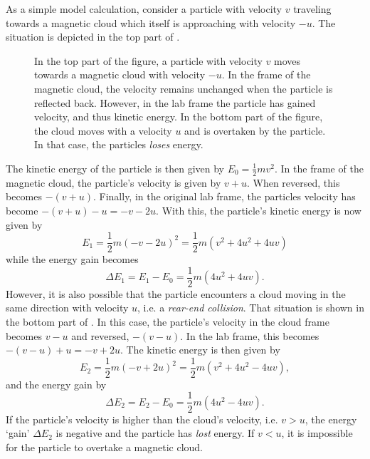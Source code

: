 As a simple model calculation, consider a particle with velocity $v$
traveling towards a magnetic cloud which itself is approaching with velocity
$-u$.  The situation is depicted in the top part of
.
\begin{figure}
\centering

\caption{  In the top part of the
figure, a particle with velocity $v$ moves towards a magnetic cloud with
velocity $-u$.  In the frame of the magnetic cloud, the velocity remains
unchanged when the particle is reflected back.  However, in the lab frame
the particle has gained velocity, and thus kinetic energy.  In the bottom
part of the figure, the cloud moves with a velocity $u$ and is overtaken
by the particle.  In that case, the particles \emph{loses} energy.}
\label{fig:fermi-2nd-order}
\end{figure}
The kinetic energy of the particle is then given by $E_0 = \frac{1}{2} m
v^2$.  In the frame of the magnetic cloud, the particle's
velocity is given by $v + u$.  When reversed, this becomes $-(v + u)$.  Finally,
in the original lab frame, the particles velocity has become $-(v + u) - u = -v
- 2u$.  With this, the particle's kinetic energy is now given by
\begin{equation}
E_1 = \frac{1}{2} m (-v - 2u)^2 = \frac{1}{2} m (v^2 + 4u^2 + 4uv)
\end{equation}
while the energy gain becomes
\begin{equation}
\Delta E_1 = E_1 - E_0 = \frac{1}{2} m (4u^2 + 4uv).
\end{equation}
%
However, it is also possible that the particle encounters a cloud moving in the
same direction with velocity $u$, i.e. a \emph{rear-end collision}.  That
situation is shown in the bottom part of .  In
this case, the particle's velocity in the cloud
frame becomes $v - u$ and reversed, $-(v - u)$.  In the lab frame, this becomes
 $-(v - u) + u = -v + 2u$.  The kinetic energy is then given by
\begin{equation}
E_2 = \frac{1}{2} m (-v + 2u)^2 = \frac{1}{2} m (v^2 + 4u^2 - 4uv),
\end{equation}
and the energy gain by
\begin{equation}
\Delta E_2 = E_2 - E_0 = \frac{1}{2} m (4u^2 - 4uv).
\end{equation}
If the particle's velocity is higher than the
cloud's velocity, i.e. $v > u$, the energy `gain' $\Delta E_2$ is negative and
the particle has \emph{lost} energy.  If $v < u$, it is
impossible for the particle to overtake a magnetic cloud.

